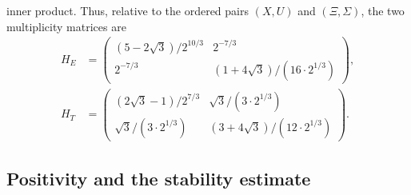 \documentclass[11pt]{article}
\theoremstyle{remark}
\begin{document}
inner product.  Thus, relative to the ordered pairs $(X,U)$ and $(\Xi,\Sigma)$, the two
multiplicity matrices are
\begin{equation}\label{eq:blocks}
\begin{aligned}
 H_E&=\begin{pmatrix}
 (5-2\sqrt3)/2^{10/3}&2^{-7/3}\\
 2^{-7/3}&(1+4\sqrt3)/(16\cdot 2^{1/3})
 \end{pmatrix},\\[4pt]
 H_T&=\begin{pmatrix}
 (2\sqrt3-1)/2^{7/3}&\sqrt3/(3\cdot 2^{1/3})\\
 \sqrt3/(3\cdot 2^{1/3})&(3+4\sqrt3)/(12\cdot 2^{1/3})
 \end{pmatrix}.
\end{aligned}
\end{equation}

\subsection{Positivity and the stability estimate}
\end{document}
